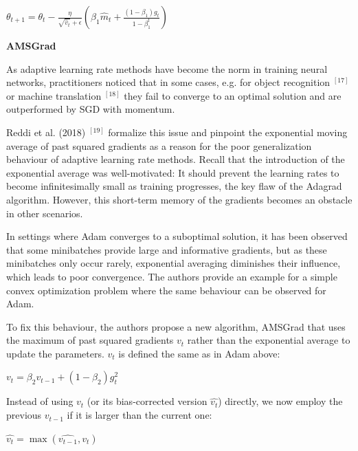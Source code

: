 \documentclass[4pt,journal,compsoc]{IEEEtran}
\begin{document}
\begin{flushleft}
    $\theta_{t+1} = \theta_{t} - \frac{\eta}{\sqrt{\hat{v}_t} + \epsilon} (\beta_1 \hat{m}_t + \frac{(1 - \beta_1) g_t}{1 - \beta^t_1})$ \newline \newline 
    
    \textbf{\Large AMSGrad} \newline
    
    As adaptive learning rate methods have become the norm in training neural networks, practitioners noticed that in some cases, e.g. for object recognition $^ {[17]}$ or machine translation $^ {[18]}$ they fail to converge to an optimal solution and are outperformed by SGD with momentum. \newline

    Reddi et al. (2018) $^ {[19]}$ formalize this issue and pinpoint the exponential moving average of past squared gradients as a reason for the poor generalization behaviour of adaptive learning rate methods. Recall that the introduction of the exponential average was well-motivated: It should prevent the learning rates to become infinitesimally small as training progresses, the key flaw of the Adagrad algorithm. However, this short-term memory of the gradients becomes an obstacle in other scenarios. \newline

    In settings where Adam converges to a suboptimal solution, it has been observed that some minibatches provide large and informative gradients, but as these minibatches only occur rarely, exponential averaging diminishes their influence, which leads to poor convergence. The authors provide an example for a simple convex optimization problem where the same behaviour can be observed for Adam. \newline

    To fix this behaviour, the authors propose a new algorithm, AMSGrad that uses the maximum of past squared gradients $v_t$ rather than the exponential average to update the parameters. $v_t$ is defined the same as in Adam above: \newline
    
    $v_t = \beta_2 v_{t-1} + (1 - \beta_2) g_t^2$ \newline
    
    Instead of using $v_t$ (or its bias-corrected version $\hat{v_t}$) directly, we now employ the previous $v_{t-1}$ if it is larger than the current one: \newline
    
    $\hat{v_t} = \max (\hat{v_{t-1}}, v_t)$ \newline
    

\end{flushleft}
\end{document}
